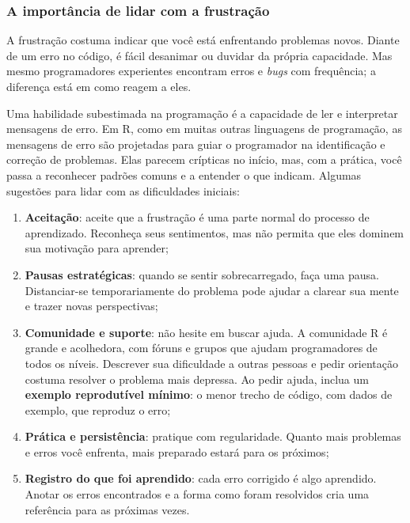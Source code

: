 \documentclass[
]{book}
\begin{document}
\subsubsection{A importância de lidar com a frustração}\label{a-importuxe2ncia-de-lidar-com-a-frustrauxe7uxe3o}

A frustração costuma indicar que você está enfrentando problemas novos. Diante de um erro no código, é fácil desanimar ou duvidar da própria capacidade. Mas mesmo programadores experientes encontram erros e \emph{bugs} com frequência; a diferença está em como reagem a eles.

Uma habilidade subestimada na programação é a capacidade de ler e interpretar mensagens de erro. Em R, como em muitas outras linguagens de programação, as mensagens de erro são projetadas para guiar o programador na identificação e correção de problemas. Elas parecem crípticas no início, mas, com a prática, você passa a reconhecer padrões comuns e a entender o que indicam. Algumas sugestões para lidar com as dificuldades iniciais:

\begin{enumerate}
\def\labelenumi{\arabic{enumi}.}
\item
  \textbf{Aceitação}: aceite que a frustração é uma parte normal do processo de aprendizado. Reconheça seus sentimentos, mas não permita que eles dominem sua motivação para aprender;
\item
  \textbf{Pausas estratégicas}: quando se sentir sobrecarregado, faça uma pausa. Distanciar-se temporariamente do problema pode ajudar a clarear sua mente e trazer novas perspectivas;
\item
  \textbf{Comunidade e suporte}: não hesite em buscar ajuda. A comunidade R é grande e acolhedora, com fóruns e grupos que ajudam programadores de todos os níveis. Descrever sua dificuldade a outras pessoas e pedir orientação costuma resolver o problema mais depressa. Ao pedir ajuda, inclua um \textbf{exemplo reprodutível mínimo}: o menor trecho de código, com dados de exemplo, que reproduz o erro;
\item
  \textbf{Prática e persistência}: pratique com regularidade. Quanto mais problemas e erros você enfrenta, mais preparado estará para os próximos;
\item
  \textbf{Registro do que foi aprendido}: cada erro corrigido é algo aprendido. Anotar os erros encontrados e a forma como foram resolvidos cria uma referência para as próximas vezes.
\end{enumerate}
\end{document}
